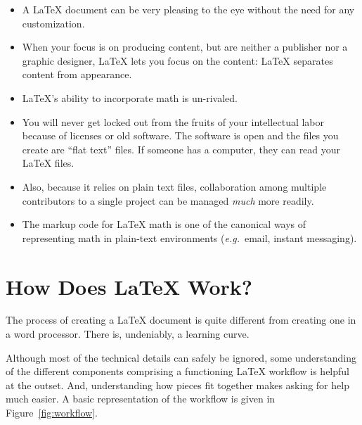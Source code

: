 \begin{itemize}

\item A \LaTeX{} document can be very pleasing to the eye without the need for
  any customization.

\item When your focus is on producing content, but are neither a publisher nor a
  graphic designer, \LaTeX{} lets you focus on the content: \LaTeX{} separates
  content from appearance.

\item \LaTeX{}'s ability to incorporate math is un-rivaled.


\item You will never get locked out from the fruits of your intellectual labor
  because of licenses or old software. The software is open and the files you
  create are ``flat text'' files. If someone has a computer, they can read your
  \LaTeX{} files.

\item Also, because it relies on plain text files, collaboration among multiple
  contributors to a single project can be managed \textit{much} more readily.

\item The markup code for \LaTeX{} math is one of the canonical ways
  of representing math in plain-text environments (\textit{e.g.}\
  email, instant messaging).

\end{itemize}

\section{How Does \LaTeX{} Work?}

\par The process of creating a \LaTeX{} document is quite different from
creating one in a word processor. There is, undeniably, a learning curve.

Although most of the technical details can safely be ignored, some understanding
of the different components comprising a functioning \LaTeX{} workflow is
helpful at the outset. And, understanding how pieces fit together makes asking
for help much easier. A basic representation of the workflow is given in
Figure~\ref{fig:workflow}.

